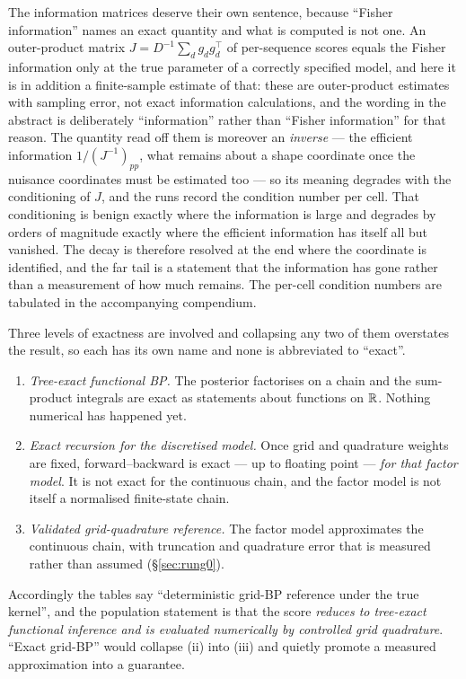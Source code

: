 The information matrices deserve their own sentence, because ``Fisher information'' names an exact
quantity and what is computed is not one. An outer-product matrix $J = D^{-1}\sum_d g_dg_d^{\top}$
of per-sequence scores equals the Fisher information only at the true parameter of a correctly
specified model, and here it is in addition a finite-sample estimate of that: these are
outer-product estimates with sampling error, not exact information calculations, and the wording
in the abstract is deliberately ``information'' rather than ``Fisher information'' for that
reason. The quantity read off them is moreover an \emph{inverse} --- the efficient information
$1/(J^{-1})_{pp}$, what remains about a shape coordinate once the nuisance coordinates must be
estimated too --- so its meaning degrades with the conditioning of $J$, and the runs record the
condition number per cell. That conditioning is benign exactly where the information is large and
degrades by orders of magnitude exactly where the efficient information has itself all but
vanished. The decay is therefore resolved at the end where the coordinate is identified, and the
far tail is a statement that the information has gone rather than a measurement of how much
remains. The per-cell condition numbers are tabulated in the accompanying compendium.

Three levels of exactness are involved and collapsing any two of them overstates the result, so
each has its own name and none is abbreviated to ``exact''.

\begin{enumerate}
\item \emph{Tree-exact functional BP.} The posterior factorises on a chain and the sum-product
integrals are exact as statements about functions on $\mathbb{R}$. Nothing numerical has happened yet.
\item \emph{Exact recursion for the discretised model.} Once grid and quadrature weights are
fixed, forward--backward is exact --- up to floating point --- \emph{for that factor model}. It
is not exact for the continuous chain, and the factor model is not itself a normalised
finite-state chain.
\item \emph{Validated grid-quadrature reference.} The factor model approximates the
continuous chain, with truncation and quadrature error that is measured rather than assumed
(\S\ref{sec:rung0}).
\end{enumerate}

Accordingly the tables say ``deterministic grid-BP reference under the true kernel'', and the
population statement is that the score \emph{reduces to tree-exact functional inference and is
evaluated numerically by controlled grid quadrature}. ``Exact grid-BP'' would collapse (ii) into
(iii) and quietly promote a measured approximation into a guarantee.

